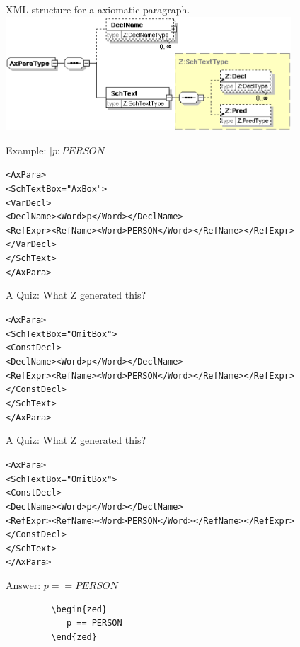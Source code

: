\documentclass[%
   slidesonly,%
   semhelv,%
   landscape]{seminar}
\begin{document}
\begin{slide}
  \begin{center}
  XML structure for a axiomatic paragraph.\\
  \includegraphics[width=0.8\textwidth]{axparatype.eps}
  \end{center}

Example:  \qquad $\mid p:PERSON$
\begin{footnotesize}
\begin{alltt}
<AxPara>
  <SchText Box="AxBox">
    <VarDecl>
      <DeclName> <Word>p</Word> </DeclName>
      <RefExpr> <RefName><Word>PERSON</Word></RefName> </RefExpr>
    </VarDecl>
  </SchText>
</AxPara>
\end{alltt}
\end{footnotesize}
\end{slide}


\begin{slide}
  \begin{center}
  A Quiz:  What Z generated this?\\
  \end{center}

\begin{footnotesize}
\begin{alltt}
<AxPara>
  <SchText Box="OmitBox">
    <ConstDecl>
      <DeclName> <Word>p</Word> </DeclName>
      <RefExpr> <RefName><Word>PERSON</Word></RefName> </RefExpr>
    </ConstDecl>
  </SchText>
</AxPara>
\end{alltt}
\end{footnotesize}
\vspace{16ex}
\end{slide}

\begin{slide}
  \begin{center}
  A Quiz:  What Z generated this?\\
  \end{center}

\begin{footnotesize}
\begin{alltt}
<AxPara>
  <SchText Box="OmitBox">
    <ConstDecl>
      <DeclName> <Word>p</Word> </DeclName>
      <RefExpr> <RefName><Word>PERSON</Word></RefName> </RefExpr>
    </ConstDecl>
  </SchText>
</AxPara>
\end{alltt}
\end{footnotesize}

Answer:  \qquad $p == PERSON$
\begin{verbatim}
         \begin{zed}
            p == PERSON
         \end{zed}
\end{verbatim}
\end{slide}
\end{document}

